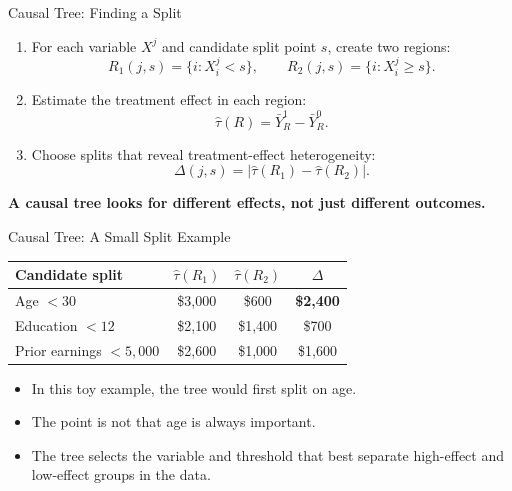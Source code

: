\documentclass[hyperref={pdfpagelabels=false}]{beamer}
\begin{document}
\begin{frame}{Causal Tree: Finding a Split}
\begin{enumerate}
  \item For each variable $X^j$ and candidate split point $s$, create two regions:
  \[
    R_1(j,s)=\{i:X_i^j<s\},
    \qquad
    R_2(j,s)=\{i:X_i^j\geq s\}.
  \]
  \vspace{0.15cm}
  \item Estimate the treatment effect in each region:
  \[
    \hat{\tau}(R)=\bar{Y}^{1}_{R}-\bar{Y}^{0}_{R}.
  \]
  \vspace{0.15cm}
  \item Choose splits that reveal treatment-effect heterogeneity:
  \[
    \Delta(j,s)
    =
    \left|\hat{\tau}(R_1)-\hat{\tau}(R_2)\right|.
  \]
\end{enumerate}

\vspace{0.1cm}
\begin{center}
\textbf{A causal tree looks for different effects, not just different outcomes.}
\end{center}
\end{frame}

\begin{frame}{Causal Tree: A Small Split Example}
\begin{center}
\small
\begin{tabular}{lccc}
\toprule
Candidate split & $\hat{\tau}(R_1)$ & $\hat{\tau}(R_2)$ & $\Delta$ \\
\midrule
Age $<30$ & \$3,000 & \$600 & \textbf{\$2,400} \\
Education $<12$ & \$2,100 & \$1,400 & \$700 \\
Prior earnings $<5{,}000$ & \$2,600 & \$1,000 & \$1,600 \\
\bottomrule
\end{tabular}
\end{center}

\vspace{0.3cm}
\begin{itemize}
  \item In this toy example, the tree would first split on age.
  \vspace{0.2cm}
  \item The point is not that age is always important.
  \vspace{0.2cm}
  \item The tree selects the variable and threshold that best separate high-effect and low-effect groups in the data.
\end{itemize}
\end{frame}
\end{document}
